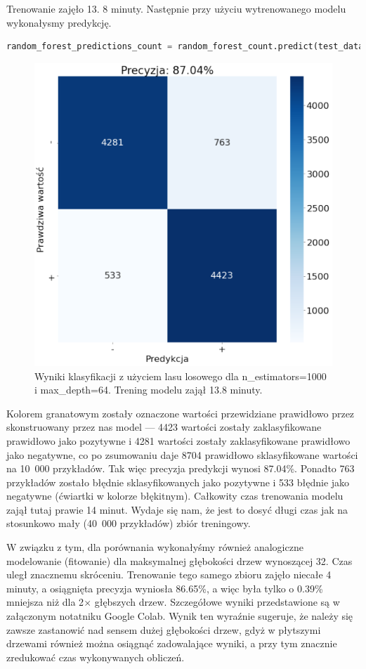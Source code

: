 \noindent Trenowanie zajęło 13. 8 minuty. Następnie przy użyciu wytrenowanego modelu wykonałysmy predykcję.


\begin{lstlisting}[language=Python,frame=single, breaklines=true, caption=Predykcja z użyciem wytrenowanego modelu lasu losowego.,label=code:rf-pred]
random_forest_predictions_count = random_forest_count.predict(test_data_count)
\end{lstlisting}


\begin{figure}[H]
	\centering
	\includegraphics[width=0.5\linewidth]{images/chapter3/rf-macierz.pdf}
	\caption{Wyniki klasyfikacji z użyciem lasu losowego dla n\_estimators=1000 i max\_depth=64. Trening modelu zajął 13.8 minuty.}
	\label{fig:macierz-rf}
\end{figure}

\noindent Kolorem granatowym zostały oznaczone wartości przewidziane prawidłowo przez skonstruowany przez nas model --- 4423 wartości zostały zaklasyfikowane prawidłowo jako pozytywne i 4281 wartości zostały zaklasyfikowane prawidłowo jako negatywne, co po zsumowaniu daje 8704 prawidłowo sklasyfikowane wartości na 10~000 przykładów. Tak więc precyzja predykcji wynosi 87.04\%. Ponadto 763 przykładów zostało błędnie sklasyfikowanych jako pozytywne i 533 błędnie jako negatywne (ćwiartki w kolorze błękitnym). Całkowity czas trenowania modelu zajął tutaj prawie 14 minut. Wydaje się nam, że jest to dosyć długi czas jak na stosunkowo mały (40~000 przykładów) zbiór treningowy.

\noindent W związku z tym, dla porównania wykonałyśmy również analogiczne modelowanie (fitowanie) dla maksymalnej głębokości drzew wynoszącej 32. Czas uległ znacznemu skróceniu. Trenowanie tego samego zbioru zajęło niecałe 4 minuty, a osiągnięta precyzja wyniosła 86.65\%, a więc była tylko o 0.39\% mniejsza niż dla 2$\times$ głębszych drzew. Szczegółowe wyniki przedstawione są w załączonym notatniku Google Colab. Wynik ten wyraźnie sugeruje, że należy się zawsze zastanowić nad sensem dużej głębokości drzew, gdyż w płytszymi drzewami również można osiągnąć zadowalające wyniki, a przy tym znacznie zredukować czas wykonywanych obliczeń.

